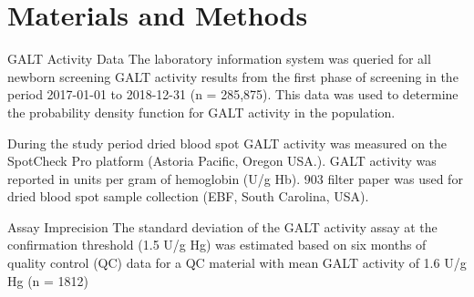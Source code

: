 \documentclass[review]{elsarticle}
\begin{document}
\section*{Materials and Methods}
\label{sec:org4f0d745}
\begin{frame}[label={sec:orgadcc720}]{GALT Activity Data}
The laboratory information system was queried for all newborn
screening GALT activity results from the first phase of screening in
the period 2017-01-01 to 2018-12-31 (n = 285,875). This data was used
to determine the probability density function for GALT activity in the
population.

During the study period dried blood spot GALT activity was measured
on the SpotCheck Pro platform (Astoria Pacific, Oregon USA.). GALT
activity was reported in units per gram of hemoglobin (U/g Hb). 903
filter paper was used for dried blood spot sample collection (EBF,
South Carolina, USA).
\end{frame}

\begin{frame}[label={sec:org9983c85}]{Assay Imprecision}
The standard deviation of the GALT activity assay at the confirmation
threshold (1.5 U/g Hg) was estimated based on six months of quality
control (QC) data for a QC material with mean GALT activity of 1.6 U/g
Hg (n = 1812)
\end{frame}
\end{document}
